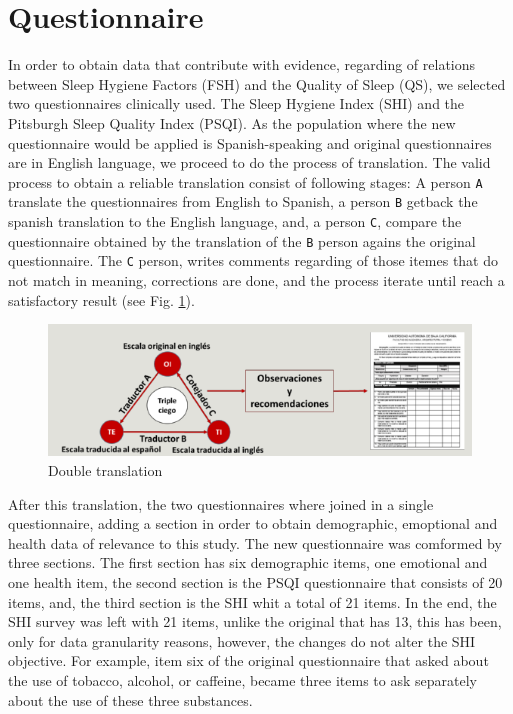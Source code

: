 \documentclass[]{book}
\begin{document}
\section{Questionnaire}\label{questionnaire}

In order to obtain data that contribute with evidence, regarding of
relations between Sleep Hygiene Factors (FSH) and the Quality of Sleep
(QS), we selected two questionnaires clinically used. The Sleep Hygiene
Index (SHI) and the Pitsburgh Sleep Quality Index (PSQI). As the
population where the new questionnaire would be applied is
Spanish-speaking and original questionnaires are in English language, we
proceed to do the process of translation. The valid process to obtain a
reliable translation consist of following stages: A person \texttt{A}
translate the questionnaires from English to Spanish, a person
\texttt{B} getback the spanish translation to the English language, and,
a person \texttt{C}, compare the questionnaire obtained by the
translation of the \texttt{B} person agains the original questionnaire.
The \texttt{C} person, writes comments regarding of those itemes that do
not match in meaning, corrections are done, and the process iterate
until reach a satisfactory result (see Fig. \ref{fig:double-tr}).

\begin{figure}

{\centering \includegraphics[width=0.8\linewidth]{images/double-translation} 

}

\caption{Double translation}\label{fig:double-tr}
\end{figure}

After this translation, the two questionnaires where joined in a single
questionnaire, adding a section in order to obtain demographic,
emoptional and health data of relevance to this study. The new
questionnaire was comformed by three sections. The first section has six
demographic items, one emotional and one health item, the second section
is the PSQI questionnaire that consists of 20 items, and, the third
section is the SHI whit a total of 21 items. In the end, the SHI survey
was left with 21 items, unlike the original that has 13, this has been,
only for data granularity reasons, however, the changes do not alter the
SHI objective. For example, item six of the original questionnaire that
asked about the use of tobacco, alcohol, or caffeine, became three items
to ask separately about the use of these three substances.
\end{document}
